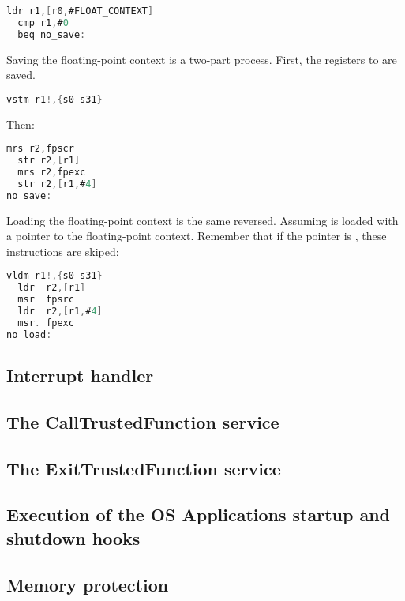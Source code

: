 \begin{lstlisting}[language=C]
  ldr r1,[r0,#FLOAT_CONTEXT]
  cmp r1,#0
  beq no_save:
\end{lstlisting}

Saving the floating-point context is a two-part process. First, the registers  to  are saved.


\begin{lstlisting}[language=C]
  vstm r1!,{s0-s31}
\end{lstlisting}

Then:

\begin{lstlisting}[language=C]
  mrs r2,fpscr
  str r2,[r1]
  mrs r2,fpexc
  str r2,[r1,#4]
no_save:
\end{lstlisting}

Loading the floating-point context is the same reversed. Assuming  is loaded with a pointer to the floating-point context. Remember that if the pointer is , these instructions are skiped:

\begin{lstlisting}[language=C]
  vldm r1!,{s0-s31}
  ldr  r2,[r1]
  msr  fpsrc
  ldr  r2,[r1,#4]
  msr. fpexc
no_load:
\end{lstlisting}




\subsection{Interrupt handler}

\subsection{The CallTrustedFunction service}
\subsection{The ExitTrustedFunction service}
\subsection{Execution of the OS Applications startup and shutdown hooks}
\subsection{Memory protection}

